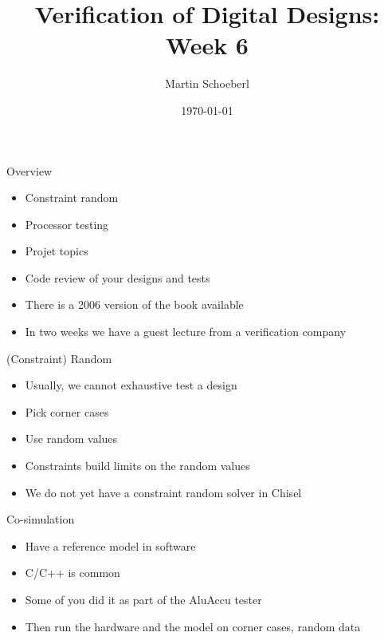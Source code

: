 

\newif\ifbook


\title{Verification of Digital Designs: Week 6}
\author{Martin Schoeberl}
\date{\today}



\begin{frame}
\titlepage
\end{frame}

\begin{frame}[fragile]{Overview}
\begin{itemize}
\item Constraint random
\item Processor testing
\item Projet topics
\item Code review of your designs and tests
\item There is a 2006 version of the book available
\item In two weeks we have a guest lecture from a verification company
\end{itemize}
\end{frame}

\begin{frame}[fragile]{(Constraint) Random}
\begin{itemize}
\item Usually, we cannot exhaustive test a design
\item Pick corner cases
\item Use random values
\item Constraints build limits on the random values
\item We do not yet have a constraint random solver in Chisel
\end{itemize}
\end{frame}

\begin{frame}[fragile]{Co-simulation}
\begin{itemize}
\item Have a reference model in software
\item C/C++ is common
\item Some of you did it as part of the AluAccu tester
\item Then run the hardware and the model on corner cases, random data
\end{itemize}
\end{frame}

